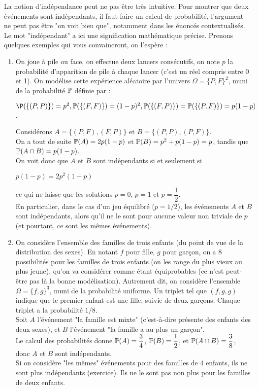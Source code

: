 \documentclass[12pt,a4paper]{report}
\begin{document}
\begin{remarque}{}
La notion d'indépendance peut ne pas être très intuitive. Pour montrer que deux événements sont indépendants, il faut faire un calcul de probabilité, l'argument ne peut pas être "on voit bien que", notamment dans les énoncés contextualisés. Le mot "indépendant" a ici une signification mathématique précise. Prenons quelques exemples qui vous convaincront, on l'espère :
\begin{enumerate}
	\item On joue à pile ou face, on effectue deux lancers consécutifs, on note $p$ la probabilité d'apparition de pile à chaque lancer (c'est un réel compris entre 0 et 1). On modélise cette expérience aléatoire par l'univers $\Omega = \{P,F\}^2$, muni de la probabilité $\mathbb{P}$ définie par :
	\begin{center}
		$\P(\{(P,P)\}) = p^2, \p(\{(F,F)\}) = (1-p)^2, \p(\{(F,P)\}) = \p(\{(P,F)\}) = p(1-p)$.
	\end{center}
	
	Considérons $A = \{(P,F),(F,P)\}$ et $B = \{(P,P),(P,F)\}$. \\
	On a tout de suite $\mathbb{P}(A) = 2p(1-p)$ et $\mathbb{P}(B) = p^2+p(1-p) = p$, tandis que $\mathbb{P}(A \cap B) = p(1-p)$. \\
	
	On voit donc que $A$ et $B$ sont indépendants si et seulement si
	\begin{center}
	$p(1-p) = 2p^2(1-p)$
	\end{center}
	ce qui ne laisse que les solutions $p = 0$, $p = 1$ et $p = \dfrac{1}{2}$. \\
	En particulier, dans le cas d'un jeu équilibré ($p = 1/2$), les événements $A$ et $B$ sont indépendants, alors qu'il ne le sont pour aucune valeur non triviale de $p$ (et pourtant, ce sont les mêmes événements). 
	
	\item On considère l'ensemble des familles de trois enfants (du point de vue de la distribution des sexes). En notant $f$ pour fille, $g$ pour garçon, on a 8 possibilités pour les familles de trois enfants (on les range du plus vieux au plus jeune), qu'on va considérer comme étant équiprobables (ce n'est peut-être pas là la bonne modélisation). Autrement dit, on considère l'ensemble $\Omega = \{f,g\}^3$, muni de la probabilité uniforme. Un triplet tel que $(f,g,g)$ indique que le premier enfant est une fille, suivie de deux garçons. Chaque triplet a la probabilité $1/8$. \\
	
	Soit $A$ l'événement "la famille est mixte" (c'est-à-dire présente des enfants des deux sexes), et $B$ l'événement "la famille a au plus un garçon". \\
	Le calcul des probabilités donne $\mathbb{P}(A) = \dfrac{3}{4}$, $\mathbb{P}(B) = \dfrac{1}{2}$, et $\mathbb{P}(A \cap B) = \dfrac{3}{8}$, donc $A$ et $B$ sont indépendants. \\
	
	Si on considère "les mêmes" événements pour des familles de $4$ enfants, ils ne sont plus indépendants (exercice). Ils ne le sont pas non plus pour les familles de deux enfants.
\end{enumerate}
\end{remarque}
\end{document}
